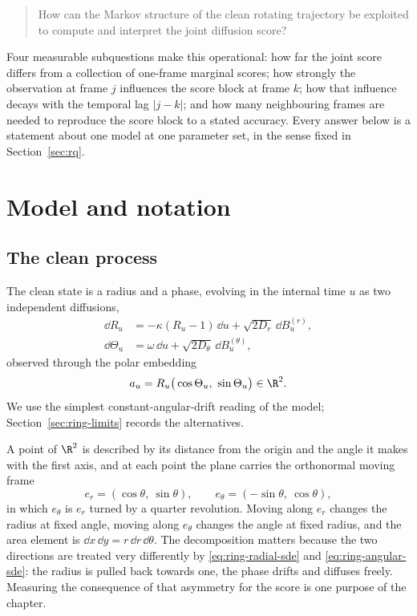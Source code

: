 \begin{quote}
How can the Markov structure of the clean rotating trajectory be exploited to
compute and interpret the joint diffusion score?
\end{quote}

Four measurable subquestions make this operational: how far the joint score
differs from a collection of one-frame marginal scores; how strongly the
observation at frame $j$ influences the score block at frame $k$; how that
influence decays with the temporal lag $|j-k|$; and how many neighbouring
frames are needed to reproduce the score block to a stated accuracy. Every
answer below is a statement about one model at one parameter set, in the sense
fixed in Section~\ref{sec:rq}.

\section{Model and notation}\label{sec:ring-model}

\subsection{The clean process}

The clean state is a radius and a phase, evolving in the internal time $u$ as
two independent diffusions,
\begin{align}
  \dd R_u &= -\kappa (R_u - 1)\,\dd u + \sqrt{2 D_r}\, \dd B_u^{(r)} ,
  \label{eq:ring-radial-sde} \\
  \dd \Theta_u &= \omega\, \dd u + \sqrt{2 D_\theta}\, \dd B_u^{(\theta)} ,
  \label{eq:ring-angular-sde}
\end{align}
observed through the polar embedding
\begin{equation}
  a_u = R_u \big(\cos\Theta_u,\ \sin\Theta_u\big) \in \R^2 .
  \label{eq:ring-embedding}
\end{equation}
We use the simplest constant-angular-drift reading of the model;
Section~\ref{sec:ring-limits} records the alternatives.

A point of $\R^2$ is described by its distance from the origin and the angle it
makes with the first axis, and at each point the plane carries the orthonormal
moving frame
\begin{equation}
  e_r = (\cos\theta,\ \sin\theta), \qquad
  e_\theta = (-\sin\theta,\ \cos\theta) ,
  \label{eq:ring-moving-frame}
\end{equation}
in which $e_\theta$ is $e_r$ turned by a quarter revolution. Moving along $e_r$
changes the radius at fixed angle, moving along $e_\theta$ changes the angle at
fixed radius, and the area element is $\dd x\,\dd y = r\,\dd r\,\dd\theta$. The
decomposition matters because the two directions are treated very differently
by \eqref{eq:ring-radial-sde} and \eqref{eq:ring-angular-sde}: the radius is
pulled back towards one, the phase drifts and diffuses freely. Measuring the
consequence of that asymmetry for the score is one purpose of the chapter.

